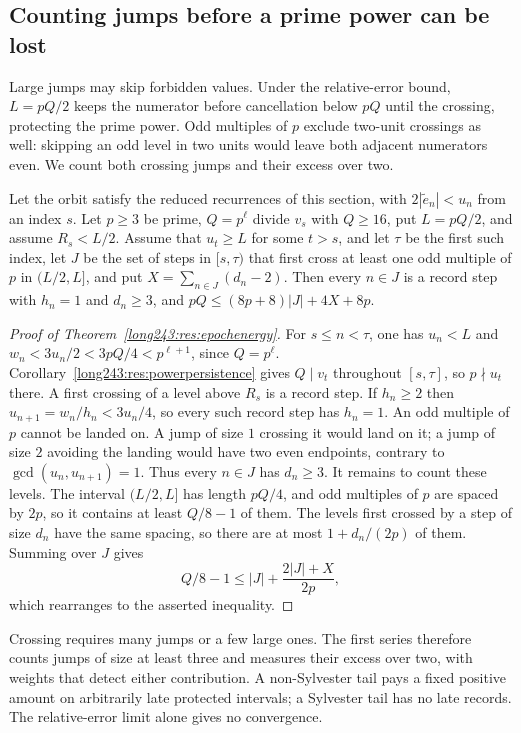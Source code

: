 \documentclass[11pt]{article}
\begin{document}
\subsection{Counting jumps before a prime power can be lost}

Large jumps may skip forbidden values. Under the relative-error
bound, $L=pQ/2$ keeps the numerator before cancellation below $pQ$
until the crossing, protecting the prime power. Odd multiples of $p$
exclude two-unit crossings as well: skipping an odd level in two
units would leave both adjacent numerators even. We count both
crossing jumps and their excess over two.

\begin{theorem}\label{long243:res:epochenergy}
Let the orbit satisfy the reduced recurrences of this section, with
$2|\tilde e_n|<u_n$ from an
index $s$.  Let $p\ge3$ be prime, $Q=p^{\ell}$ divide $v_s$ with $Q\ge16$, put
$L=pQ/2$, and assume $R_s<L/2$. Assume that $u_t\ge L$ for some $t>s$,
and let $\tau$ be the first such index, let $J$ be the set of steps in $[s,\tau)$ that first cross at least one odd
multiple of $p$ in $(L/2,L]$, and put $X=\sum_{n\in J}(d_n-2)$.  Then every
$n\in J$ is a record step with $h_n=1$ and $d_n\ge3$, and
$pQ\le(8p+8)\lvert J\rvert+4X+8p$.
\end{theorem}

\begin{proof}[Proof of Theorem~\ref{long243:res:epochenergy}]
For $s\le n<\tau$, one has $u_n<L$ and
$w_n<3u_n/2<3pQ/4<p^{\ell+1}$, since $Q=p^{\ell}$.
Corollary~\ref{long243:res:powerpersistence} gives $Q\mid v_t$ throughout
$[s,\tau]$, so $p\nmid u_t$ there. A first crossing of a level above $R_s$
is a record step. If $h_n\ge2$ then $u_{n+1}=w_n/h_n<3u_n/4$, so every
such record step has $h_n=1$.
An odd multiple of $p$ cannot be landed on. A jump of size $1$ crossing it
would land on it; a jump of size $2$ avoiding the landing would have two
even endpoints, contrary to $\gcd(u_n,u_{n+1})=1$. Thus every $n\in J$
has $d_n\ge3$.
It remains to count these levels. The interval $(L/2,L]$ has length
$pQ/4$, and odd multiples of $p$ are spaced by $2p$, so it contains
at least $Q/8-1$ of them. The levels first crossed by a step of size
$d_n$ have the same spacing, so
there are at most $1+d_n/(2p)$ of them. Summing over $J$ gives
\[
 Q/8-1\le |J|+\frac{2|J|+X}{2p},
\]
which rearranges to the asserted inequality.
\end{proof}

Crossing requires many jumps or a few large ones. The first series
therefore counts jumps of size at least three and measures their
excess over two, with weights that detect either contribution.
A non-Sylvester tail pays a fixed positive amount on arbitrarily late
protected intervals; a Sylvester tail has no late records. The
relative-error limit alone gives no convergence.
\end{document}
